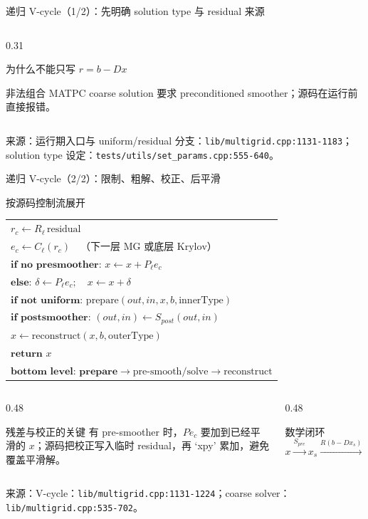 \documentclass[UTF8,aspectratio=169,11pt]{ctexbeamer}
\newcommand{\source}[1]{\vspace{0.04em}\par\noindent\parbox[t]{0.96\linewidth}{\raggedright\tiny\color{muted}来源：#1\par}}
\newcommand{\codepath}[1]{\nolinkurl{#1}}
\begin{document}
\begin{frame}[t]{递归 V-cycle（1/2）：先明确 solution type 与 residual 来源}
\begin{columns}[T,totalwidth=\textwidth]
\begin{column}{0.31\textwidth}
\begin{block}{为什么不能只写 $r=b-Dx$}
      \end{block}
      \begin{alertblock}{非法组合}
        MATPC coarse solution 要求 preconditioned smoother；源码在运行前直接报错。
      \end{alertblock}
    \end{column}
  \end{columns}
  \source{运行期入口与 uniform/residual 分支：\codepath{lib/multigrid.cpp:1131-1183}；solution type 设定：\codepath{tests/utils/set_params.cpp:555-640}。}
\end{frame}

\begin{frame}[t]{递归 V-cycle（2/2）：限制、粗解、校正、后平滑}
  \footnotesize
  \begin{block}{按源码控制流展开}
    \begin{tabular}{@{}l@{}}
      $r_c\leftarrow R_\ell\,\text{residual}$ \\
      $e_c\leftarrow C_\ell(r_c)\quad\text{（下一层 MG 或底层 Krylov）}$ \\
      $\textbf{if no presmoother: }x\leftarrow x+P_\ell e_c$ \\
      $\textbf{else: }\delta\leftarrow P_\ell e_c;\quad x\leftarrow x+\delta$ \\
      $\textbf{if not uniform: }\text{prepare}(out,in,x,b,\text{innerType})$ \\
      $\textbf{if postsmoother: }(out,in)\leftarrow S_{post}(out,in)$ \\
      $x\leftarrow\text{reconstruct}(x,b,\text{outerType})$ \\
      $\textbf{return }x$ \\
      $\textbf{bottom level: prepare}\to\text{pre-smooth/solve}\to\text{reconstruct}$
    \end{tabular}
  \end{block}
  \begin{columns}[T,totalwidth=\textwidth]
    \begin{column}{0.48\textwidth}
      \begin{block}{残差与校正的关键}
        有 pre-smoother 时，$P e_c$ 要加到已经平滑的 $x$；源码把校正写入临时 residual，再 `xpy' 累加，避免覆盖平滑解。
      \end{block}
    \end{column}
    \begin{column}{0.48\textwidth}
      \begin{block}{数学闭环}
        \begin{equation*}
          x\xrightarrow{S_{pre}}x_s\xrightarrow{R(b-Dx_s)}e_c
          \xrightarrow{P}x_s+Pe_c\xrightarrow{S_{post}}x^+.
        \end{equation*}
      \end{block}
    \end{column}
  \end{columns}
  \source{V-cycle：\codepath{lib/multigrid.cpp:1131-1224}；coarse solver：\codepath{lib/multigrid.cpp:535-702}。}
\end{frame}
\end{document}
